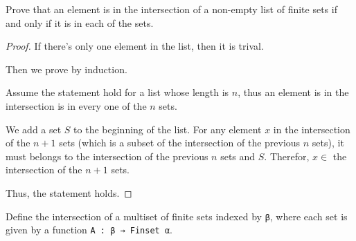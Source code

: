 \begin{lemma}\label{List.eq_FinInter}
  \leanok
  Prove that an element is in the intersection of a non-empty list of finite sets if and only if it is in each of the sets.
\end{lemma}

\begin{proof}
  \leanok
  If there's only one element in the list, then it is trival.

  Then we prove by induction.

  Assume the statement hold for a list whose length is $n$, thus an element is in the intersection is in every one of the $n$ sets.

  We add a set $S$ to the beginning of the list. For any element $x$ in the intersection of the $n+1$ sets (which is a subset of the intersection of the previous $n$ sets), it must belongs to the intersection of the previous $n$ sets and $S$. Therefor, $x\in$ the intersection of the $n+1$ sets.

  Thus, the statement holds.

\end{proof}

\begin{definition}\label{Multiset.FinInter}
  \leanok
  Define the intersection of a multiset of finite sets indexed by \verb|β|, where each set is given by a function \verb|A : β → Finset α|.
\end{definition}

